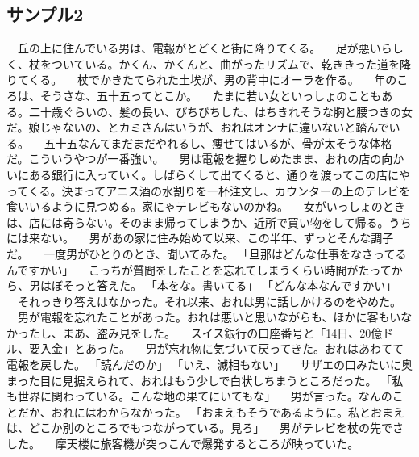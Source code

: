 \documentclass[11pt,a4paper,openright]{ltjsbook}
\begin{document}
\subsection{サンプル2}

　丘の上に住んでいる男は、電報がとどくと街に降りてくる。
　足が悪いらしく、杖をついている。かくん、かくんと、曲がったリズムで、乾ききった道を降りてくる。
　杖でかきたてられた土埃が、男の背中にオーラを作る。
　年のころは、そうさな、五十五ってとこか。
　たまに若い女といっしょのこともある。二十歳ぐらいの、髪の長い、ぴちぴちした、はちきれそうな胸と腰つきの女だ。娘じゃないの、とカミさんはいうが、おれはオンナに違いないと踏んでいる。
　五十五なんてまだまだやれるし、痩せてはいるが、骨が太そうな体格だ。こういうやつが一番強い。
　男は電報を握りしめたまま、おれの店の向かいにある銀行に入っていく。しばらくして出てくると、通りを渡ってこの店にやってくる。決まってアニス酒の水割りを一杯注文し、カウンターの上のテレビを食いいるように見つめる。家にゃテレビもないのかね。
　女がいっしょのときは、店には寄らない。そのまま帰ってしまうか、近所で買い物をして帰る。うちには来ない。
　男があの家に住み始めて以来、この半年、ずっとそんな調子だ。
　一度男がひとりのとき、聞いてみた。
「旦那はどんな仕事をなさってるんですかい」
　こっちが質問をしたことを忘れてしまうくらい時間がたってから、男はぼそっと答えた。
「本をな。書いてる」
「どんな本なんですかい」
　それっきり答えはなかった。それ以来、おれは男に話しかけるのをやめた。
　男が電報を忘れたことがあった。おれは悪いと思いながらも、ほかに客もいなかったし、まあ、盗み見をした。
　スイス銀行の口座番号と「14日、20億ドル、要入金」とあった。
　男が忘れ物に気づいて戻ってきた。おれはあわてて電報を戻した。
「読んだのか」
「いえ、滅相もない」
　サザエの口みたいに奥まった目に見据えられて、おれはもう少しで白状しちまうところだった。
「私も世界に関わっている。こんな地の果てにいてもな」
　男が言った。なんのことだか、おれにはわからなかった。
「おまえもそうであるように。私とおまえは、どこか別のところでもつながっている。見ろ」
　男がテレビを杖の先でさした。
　摩天楼に旅客機が突っこんで爆発するところが映っていた。
\end{document}
